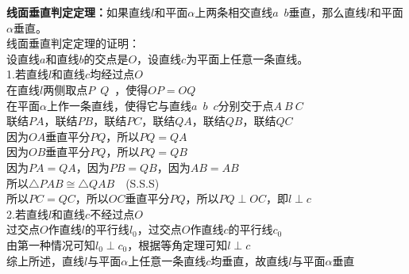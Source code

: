 \documentclass[UTF8]{ctexart}
\begin{document}
    \textbf{线面垂直判定定理：}如果直线$l$和平面$\alpha$上两条相交直线$a$~$b$垂直，那么直线$l$和平面$\alpha$垂直。\\[4mm]
    线面垂直判定定理的证明：\\[3mm]
    设直线$a$和直线$b$的交点是$O$，设直线$c$为平面上任意一条直线。\\[4mm]
    1.若直线$l$和直线$c$均经过点$O$\\[3mm]
    在直线$l$两侧取点$P$~$Q$~，使得$OP=OQ$\\[3mm]
    在平面$\alpha$上作一条直线，使得它与直线$a$~$b$~$c$分别交于点$A~B~C$\\[3mm]
    联结$PA$，联结$PB$，联结$PC$，联结$QA$，联结$QB$，联结$QC$\\[3mm]
    因为$OA$垂直平分$PQ$，所以$PQ=QA$\\[3mm]
    因为$OB$垂直平分$PQ$，所以$PQ=QB$\\[3mm]
    因为$PA=QA$，因为$PB=QB$，因为$AB=AB$\\[3mm]
    所以$\triangle PAB\cong\triangle QAB$~~(S.S.S)\\[3mm]
    所以$PC=QC$，所以$OC$垂直平分$PQ$，所以$PQ\perp OC$，即$l\perp c$\\[5mm]
    2.若直线$l$和直线$c$不经过点$O$\\[3mm]
    过交点$O$作直线$l$的平行线$l_0$，过交点$O$作直线$c$的平行线$c_0$\\[3mm]
    由第一种情况可知$l_0\perp c_0$，根据等角定理可知$l\perp c$\\[5mm]
    综上所述，直线$l$与平面$\alpha$上任意一条直线$c$均垂直，故直线$l$与平面$\alpha$垂直\vspace{8pt}
\end{document}
